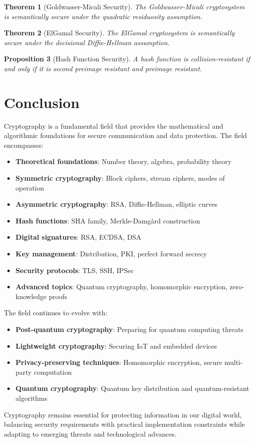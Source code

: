 \documentclass[11pt,a4paper]{article}
\newtheorem{theorem}{Theorem}[section]
\newtheorem{proposition}[theorem]{Proposition}
\begin{document}
\begin{theorem}[Goldwasser-Micali Security]
The Goldwasser-Micali cryptosystem is semantically secure under the quadratic residuosity assumption.
\end{theorem}

\begin{theorem}[ElGamal Security]
The ElGamal cryptosystem is semantically secure under the decisional Diffie-Hellman assumption.
\end{theorem}

\begin{proposition}[Hash Function Security]
A hash function is collision-resistant if and only if it is second preimage resistant and preimage resistant.
\end{proposition}

\section{Conclusion}

Cryptography is a fundamental field that provides the mathematical and algorithmic foundations for secure communication and data protection. The field encompasses:

\begin{itemize}
\item \textbf{Theoretical foundations}: Number theory, algebra, probability theory
\item \textbf{Symmetric cryptography}: Block ciphers, stream ciphers, modes of operation
\item \textbf{Asymmetric cryptography}: RSA, Diffie-Hellman, elliptic curves
\item \textbf{Hash functions}: SHA family, Merkle-Damgård construction
\item \textbf{Digital signatures}: RSA, ECDSA, DSA
\item \textbf{Key management}: Distribution, PKI, perfect forward secrecy
\item \textbf{Security protocols}: TLS, SSH, IPSec
\item \textbf{Advanced topics}: Quantum cryptography, homomorphic encryption, zero-knowledge proofs
\end{itemize}

The field continues to evolve with:
\begin{itemize}
\item \textbf{Post-quantum cryptography}: Preparing for quantum computing threats
\item \textbf{Lightweight cryptography}: Securing IoT and embedded devices
\item \textbf{Privacy-preserving techniques}: Homomorphic encryption, secure multi-party computation
\item \textbf{Quantum cryptography}: Quantum key distribution and quantum-resistant algorithms
\end{itemize}

Cryptography remains essential for protecting information in our digital world, balancing security requirements with practical implementation constraints while adapting to emerging threats and technological advances.
\end{document}
